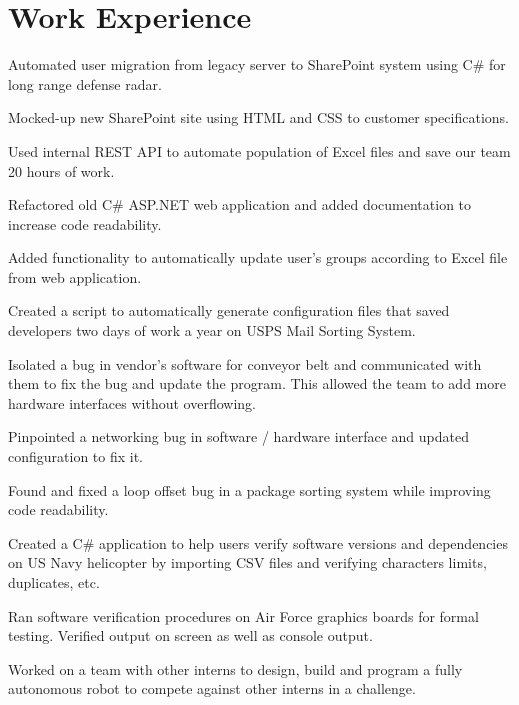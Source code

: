 \documentclass[]{deedy-resume-openfont}
\begin{document}
\section{Work Experience}
\hfill {}
\begin{tightemize}
	\item Automated user migration from legacy server to SharePoint system using C\# for long range defense radar.
	\item Mocked-up new SharePoint site using HTML and CSS to customer specifications.
	\item Used internal REST API to automate population of Excel files and save our team 20 hours of work.
	\item Refactored old C\# ASP.NET web application and added documentation to increase code readability.
	\item Added functionality to automatically update user's groups according to Excel file from web application.
\end{tightemize}
\sectionsep
{}\hfill {}
\begin{tightemize}
	\item Created a script to automatically generate configuration files that saved developers two days of work a year on USPS Mail Sorting System.
	\item Isolated a bug in vendor's software for conveyor belt and communicated with them to fix the bug and update the program. This allowed the team to add more hardware interfaces without overflowing. 
	\item Pinpointed a networking bug in software / hardware interface and updated configuration to fix it.
	\item Found and fixed a loop offset bug in a package sorting system while improving code readability.
\end{tightemize}
\sectionsep
{}\hfill {}
\begin{tightemize}
	\item Created a C\# application to help users verify software versions and dependencies on US Navy helicopter by importing CSV files and verifying characters limits, duplicates, etc.
	\item Ran software verification procedures on Air Force graphics boards for formal testing. Verified output on screen as well as console output.
	\item Worked on a team with other interns to design, build and program a fully autonomous robot to compete against other interns in a challenge. 
\end{tightemize}
\end{document}
